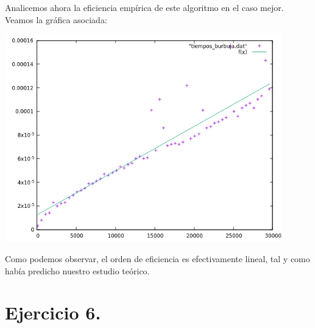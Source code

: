 \documentclass[11pt,a4paper]{article}
\begin{document}
Analicemos ahora la eficiencia empírica de este algoritmo en el caso mejor. Veamos la gráfica asociada:

\begin{center}
\includegraphics[width=12cm]{img/tiempo_burbuja_modificada}
\end{center}

Como podemos observar, el orden de eficiencia es efectivamente lineal, tal y como había predicho nuestro estudio teórico.

\section*{Ejercicio 6.}
\end{document}
